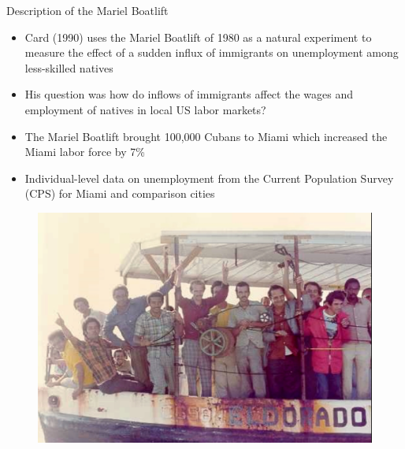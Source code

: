 \documentclass{beamer}
\begin{document}
\begin{frame}{Description of the Mariel Boatlift}
	
	\begin{itemize}
	\item Card (1990) uses the Mariel Boatlift of 1980 as a natural experiment to measure the effect of a sudden influx of immigrants on unemployment among less-skilled natives
	\item His question was how do inflows of immigrants affect the wages and employment of natives in local US labor markets?
	\item The Mariel Boatlift brought 100,000 Cubans to Miami which increased the Miami labor force by 7\%
	\item Individual-level data on unemployment from the Current Population Survey (CPS) for Miami and comparison cities
	\end{itemize}
\end{frame}


\begin{frame}[plain]
	\begin{figure}
	\includegraphics[scale=0.25]{./lecture_includes/boatlift2.png}
	\end{figure}
\end{frame}
\end{document}
